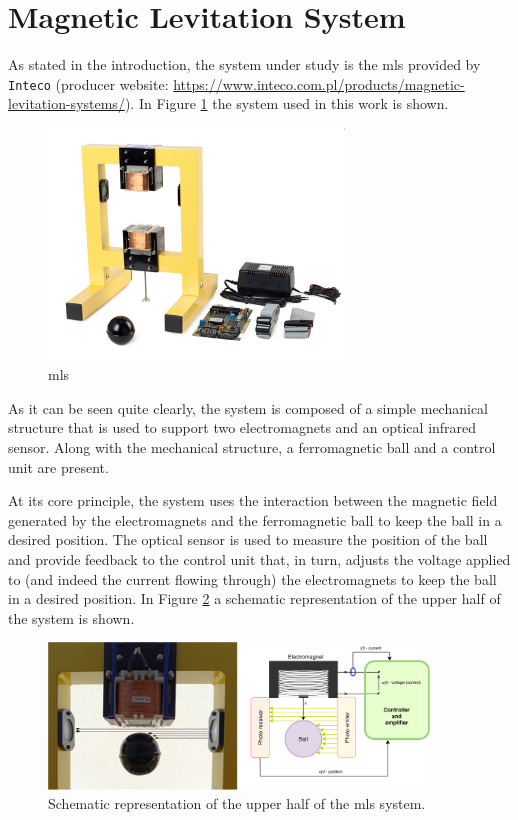 \section{Magnetic Levitation System}
\label{sec:magnetic_levitation_system}

As stated in the introduction, the system under study is the \acrfull{mls} provided by \texttt{Inteco} (producer website: \url{https://www.inteco.com.pl/products/magnetic-levitation-systems/}).
In Figure \ref{fig:MLS} the system used in this work is shown.

\begin{figure}[H]
    \centering
    \includegraphics[width=0.7\textwidth]{./img/maglev_and_components.jpg}
    \caption{\acrlong{mls}}
    \label{fig:MLS}
\end{figure}

As it can be seen quite clearly, the system is composed of a simple mechanical structure that is used to support two electromagnets and an optical infrared sensor.
Along with the mechanical structure, a ferromagnetic ball and a control unit are present.

At its core principle, the system uses the interaction between the magnetic field generated by the electromagnets and the ferromagnetic ball to keep the ball in a desired position.
The optical sensor is used to measure the position of the ball and provide feedback to the control unit that, in turn, adjusts the voltage applied to (and indeed the current flowing through) the electromagnets to keep the ball in a desired position.
In Figure \ref{fig:MLS_general_scheme} a schematic representation of the upper half of the system is shown.

\begin{figure}[H]
    \centering
    \includegraphics[width=0.9\textwidth]{./img/maglev_general_scheme.png}
    \caption{Schematic representation of the upper half of the \acrshort{mls} system.}
    \label{fig:MLS_general_scheme}
\end{figure}

